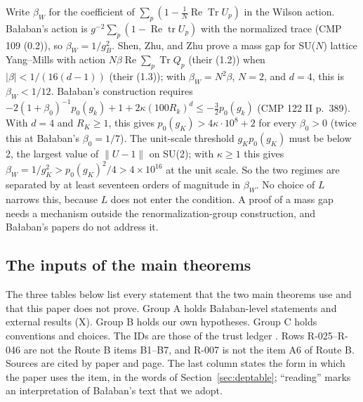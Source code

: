 Write $\beta_W$ for the coefficient of $\sum_p(1-\tfrac1N\operatorname{Re}\operatorname{Tr}U_p)$ in the Wilson action. Ba{\l}aban's action is $g^{-2}\sum_p(1-\operatorname{Re}\operatorname{tr}U_p)$ with the normalized trace (CMP 109 (0.2)), so $\beta_W=1/g_B^2$. Shen, Zhu, and Zhu \cite{shenzhuzhu2023} prove a mass gap for SU($N$) lattice Yang--Mills with action $N\beta\operatorname{Re}\sum_p\operatorname{Tr}Q_p$ (their (1.2)) when $|\beta|<1/(16(d-1))$ (their (1.3)); with $\beta_W=N^2\beta$, $N=2$, and $d=4$, this is $\beta_W<1/12$. Ba{\l}aban's construction requires $-2(1+\beta_0)^{-1}p_0(g_k)+1+2\kappa(100R_k)^d\le-\tfrac32p_0(g_k)$ (CMP 122 II p.\ 389). With $d=4$ and $R_K\ge1$, this gives $p_0(g_K)>4\kappa\cdot10^8+2$ for every $\beta_0>0$ (twice this at Ba{\l}aban's $\beta_0=1/7$). The unit-scale threshold $g_Kp_0(g_K)$ must be below 2, the largest value of $\|U-1\|$ on SU(2); with $\kappa\ge1$ this gives $\beta_W=1/g_K^2>p_0(g_K)^2/4>4\times10^{16}$ at the unit scale. So the two regimes are separated by at least seventeen orders of magnitude in $\beta_W$. No choice of $L$ narrows this, because $L$ does not enter the condition. A proof of a mass gap needs a mechanism outside the renormalization-group construction, and Ba{\l}aban's papers do not address it.

\subsection{The inputs of the main theorems}\label{sec:rem-ledger}

The three tables below list every statement that the two main theorems use and that this paper does not prove. Group A holds Ba{\l}aban-level statements and external results (X). Group B holds our own hypotheses. Group C holds conventions and choices. The IDs are those of the trust ledger . Rows R-025--R-046 are not the Route B items B1--B7, and R-007 is not the item A6 of Route B. Sources are cited by paper and page. The last column states the form in which the paper uses the item, in the words of Section~\ref{sec:deptable}; ``reading'' marks an interpretation of Ba{\l}aban's text that we adopt.

